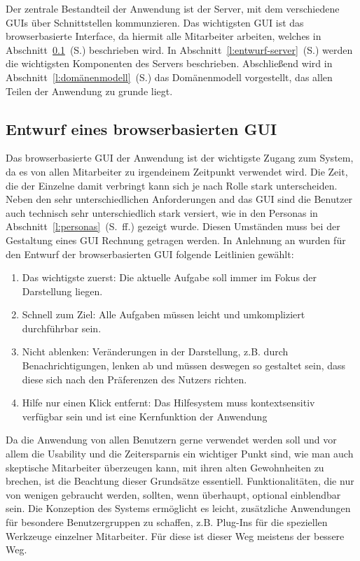 Der zentrale Bestandteil der Anwendung ist der Server, mit dem verschiedene GUIs über Schnittstellen kommunzieren. Das wichtigsten GUI ist das browserbasierte Interface, da hiermit alle Mitarbeiter arbeiten, welches in Abschnitt~\ref{l:entwurf-gui}~(S.\pageref{l:entwurf-gui}) beschrieben wird. In Abschnitt~\ref{l:entwurf-server}~(S.\pageref{l:entwurf-server}) werden die wichtigsten Komponenten des Servers beschrieben. Abschließend wird in Abschnitt~\ref{l:domänenmodell}~(S.\pageref{l:domänenmodell}) das Domänenmodell vorgestellt, das allen Teilen der Anwendung zu grunde liegt.

\subsection{Entwurf eines browserbasierten GUI}\label{l:entwurf-gui}

Das browserbasierte GUI der Anwendung ist der wichtigste Zugang zum System, da es von allen Mitarbeiter zu irgendeinem Zeitpunkt verwendet wird. Die Zeit, die der Einzelne damit verbringt kann sich je nach Rolle stark unterscheiden. Neben den sehr unterschiedlichen Anforderungen and das GUI sind die Benutzer auch technisch sehr unterschiedlich stark versiert, wie in den Personas in Abschnitt~\ref{l:personas}~(S.\pageref{l:personas}~ff.) gezeigt wurde. Diesen Umständen muss bei der Gestaltung eines GUI Rechnung getragen werden. In Anlehnung an \cite{nielsen} wurden für den Entwurf der browserbasierten GUI folgende Leitlinien gewählt:

\begin{enumerate}\itemsep -5pt
\item{Das wichtigste zuerst: Die aktuelle Aufgabe soll immer im Fokus der Darstellung liegen.}
\item{Schnell zum Ziel: Alle Aufgaben müssen leicht und umkompliziert durchführbar sein.}
\item{Nicht ablenken: Veränderungen in der Darstellung, z.B. durch Benachrichtigungen, lenken ab und müssen deswegen so gestaltet sein, dass diese sich nach den Präferenzen des Nutzers richten.}
\item{Hilfe nur einen Klick entfernt: Das Hilfesystem muss kontextsensitiv verfügbar sein und ist eine Kernfunktion der Anwendung}
\end{enumerate}

Da die Anwendung von allen Benutzern gerne verwendet werden soll und vor allem die Usability und die Zeitersparnis ein wichtiger Punkt sind, wie man auch skeptische Mitarbeiter überzeugen kann, mit ihren alten Gewohnheiten zu brechen, ist die Beachtung dieser Grundsätze essentiell. Funktionalitäten, die nur von wenigen gebraucht werden, sollten, wenn überhaupt, optional einblendbar sein. Die Konzeption des Systems ermöglicht es leicht, zusätzliche Anwendungen für besondere Benutzergruppen zu schaffen, z.B. Plug-Ins für die speziellen Werkzeuge einzelner Mitarbeiter. Für diese  ist dieser Weg meistens der bessere Weg.


